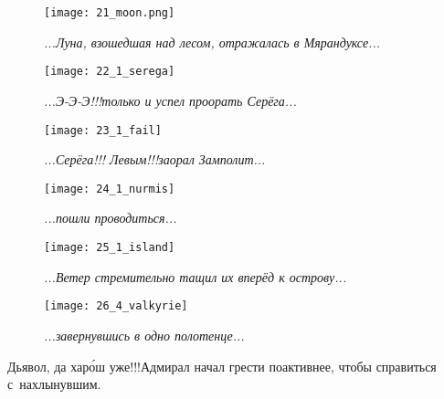 \begin{figure}[h]
	\centering
	\texttt{[image: 21\_moon.png]}
	\caption{\small\textit{...Луна, взошедшая над лесом, отражалась в Мярандуксе...}}
\end{figure}

\newpage

\begin{figure}[h]
	\centering
	\texttt{[image: 22\_1\_serega]}
	\caption{\small\textit{...Э-Э-Э!!!\mdash только и успел проорать Серёга...}}
\end{figure}

\newpage

\begin{figure}[h]
	\centering
	\texttt{[image: 23\_1\_fail]}
	\caption{\small\textit{...Серёга!!! Левым!!!\mdash заорал Замполит...}}
\end{figure}

\newpage

\begin{figure}[h]
	\centering
	\texttt{[image: 24\_1\_nurmis]}
	\caption{\small\textit{...пошли проводиться...}}
\end{figure}

\newpage

\begin{figure}[h]
	\centering
	\texttt{[image: 25\_1\_island]}
	\caption{\small\textit{...Ветер стремительно тащил их вперёд к острову...}}
\end{figure}

\newpage

\begin{wrapfigure}[23]{l}{0.6\textwidth}
	\centering
	\texttt{[image: 26\_4\_valkyrie]}
	\caption{\small\textit{...завернувшись в одно полотенце...}}
\end{wrapfigure}

\diagdash Дьявол, да хар{\'о}ш уже!!!\mdash Адмирал начал грести по\sdash активнее, чтобы справиться с~нахлынувшим.

